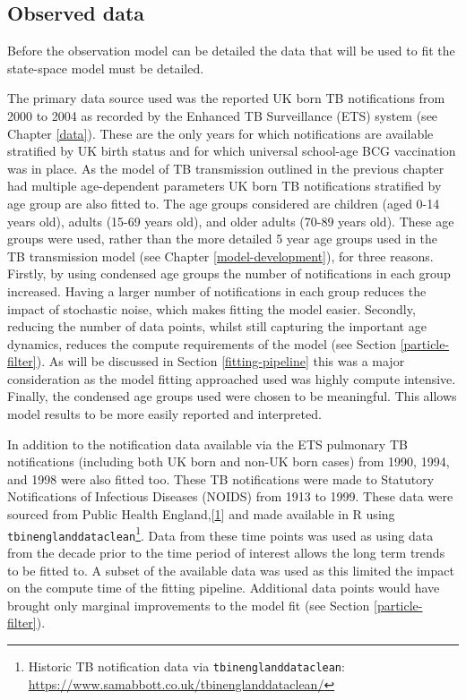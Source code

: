 \documentclass[11pt,twoside]{bristolthesis}
\begin{document}
  \hypertarget{observed-data}{%
  \subsection{Observed data}\label{observed-data}}
  
  Before the observation model can be detailed the data that will be used to fit the state-space model must be detailed.
  
  The primary data source used was the reported UK born TB notifications from 2000 to 2004 as recorded by the Enhanced TB Surveillance (ETS) system (see Chapter \ref{data}). These are the only years for which notifications are available stratified by UK birth status and for which universal school-age BCG vaccination was in place. As the model of TB transmission outlined in the previous chapter had multiple age-dependent parameters UK born TB notifications stratified by age group are also fitted to. The age groups considered are children (aged 0-14 years old), adults (15-69 years old), and older adults (70-89 years old). These age groups were used, rather than the more detailed 5 year age groups used in the TB transmission model (see Chapter \ref{model-development}), for three reasons. Firstly, by using condensed age groups the number of notifications in each group increased. Having a larger number of notifications in each group reduces the impact of stochastic noise, which makes fitting the model easier. Secondly, reducing the number of data points, whilst still capturing the important age dynamics, reduces the compute requirements of the model (see Section \ref{particle-filter}). As will be discussed in Section \ref{fitting-pipeline} this was a major consideration as the model fitting approached used was highly compute intensive. Finally, the condensed age groups used were chosen to be meaningful. This allows model results to be more easily reported and interpreted.
  
  In addition to the notification data available via the ETS pulmonary TB notifications (including both UK born and non-UK born cases) from 1990, 1994, and 1998 were also fitted too. These TB notifications were made to Statutory Notifications of Infectious Diseases (NOIDS) from 1913 to 1999. These data were sourced from Public Health England,{[}\protect\hyperlink{ref-PHE2017}{1}{]} and made available in R using \texttt{tbinenglanddataclean}\footnote{Historic TB notification data via \texttt{tbinenglanddataclean}: \url{https://www.samabbott.co.uk/tbinenglanddataclean/}}. Data from these time points was used as using data from the decade prior to the time period of interest allows the long term trends to be fitted to. A subset of the available data was used as this limited the impact on the compute time of the fitting pipeline. Additional data points would have brought only marginal improvements to the model fit (see Section \ref{particle-filter}).
  
\end{document}
